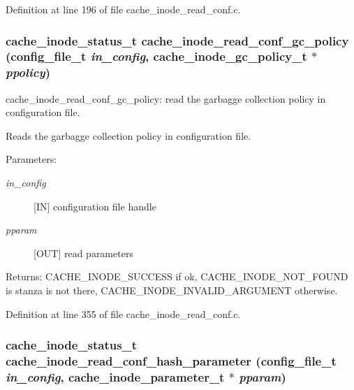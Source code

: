 Definition at line 196 of file cache\_\-inode\_\-read\_\-conf.c.
\subsubsection{\setlength{\rightskip}{0pt plus 5cm}cache\_\-inode\_\-status\_\-t cache\_\-inode\_\-read\_\-conf\_\-gc\_\-policy (config\_\-file\_\-t {\em in\_\-config}, cache\_\-inode\_\-gc\_\-policy\_\-t $\ast$ {\em ppolicy})}\label{cache__inode__read__conf_8c_a2}


cache\_\-inode\_\-read\_\-conf\_\-gc\_\-policy: read the garbagge collection policy in configuration file.

Reads the garbagge collection policy in configuration file.

\begin{Desc}
\item[Parameters:]
\begin{description}
\item[{\em in\_\-config}][IN] configuration file handle \item[{\em pparam}][OUT] read parameters\end{description}
\end{Desc}
\begin{Desc}
\item[Returns:]CACHE\_\-INODE\_\-SUCCESS if ok, CACHE\_\-INODE\_\-NOT\_\-FOUND is stanza is not there, CACHE\_\-INODE\_\-INVALID\_\-ARGUMENT otherwise. \end{Desc}


Definition at line 355 of file cache\_\-inode\_\-read\_\-conf.c.
\subsubsection{\setlength{\rightskip}{0pt plus 5cm}cache\_\-inode\_\-status\_\-t cache\_\-inode\_\-read\_\-conf\_\-hash\_\-parameter (config\_\-file\_\-t {\em in\_\-config}, cache\_\-inode\_\-parameter\_\-t $\ast$ {\em pparam})}\label{cache__inode__read__conf_8c_a0}


